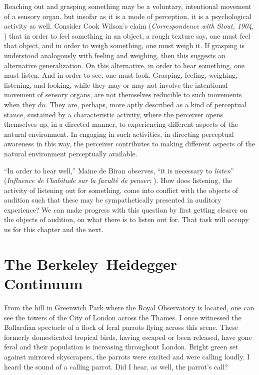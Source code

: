 Reaching out and grasping something may be a voluntary, intentional movement of a sensory organ, but insofar as it is a mode of perception, it is a psychological activity as well. Consider Cook Wilson's claim (\emph{Correspondence with Stout, 1904}, \citeyear{Cook-Wilson:1926sf}) that in order to feel something in an object, a rough texture say, one must feel that object, and in order to weigh something, one must weigh it. If grasping is understood analogously with feeling and weighing, then this suggests an alternative generalization. On this alternative, in order to hear something, one must listen. And in order to see, one must look. Grasping, feeling, weighing, listening, and looking, while they may or may not involve the intentional movement of sensory organs, are not themselves reducible to such movements when they do. They are, perhaps, more aptly described as a kind of perceptual stance, sustained by a characteristic activity, where the perceiver opens themselves up, in a directed manner, to experiencing different aspects of the natural environment. In engaging in such activities, in directing perceptual awareness in this way, the perceiver contributes to making different aspects of the natural environment perceptually available.

``In order to hear well,'' Maine de Biran observes, ``it is necessary to \emph{listen}'' (\emph{Influence de l'habitude sur la faculté de penser}; \citealt[63--4]{Boehm:1929aa}). How does listening, the activity of listening out for something, come into conflict with the objects of audition such that these may be sympathetically presented in auditory experience? We can make progress with this question by first getting clearer on the objects of audition, on what there is to listen out for. That task will occupy us for this chapter and the next.


\section{The Berkeley--Heidegger Continuum} %
\label{sec:the_berkeley_heidegger_continuum}

From the hill in Greenwich Park where the Royal Observatory is located, one can see the towers of the City of London across the Thames. I once witnessed the Ballardian spectacle of a flock of feral parrots flying across this scene. These formerly domesticated tropical birds, having escaped or been released, have gone feral and their population is increasing throughout London. Bright green set against mirrored skyscrapers, the parrots were excited and were calling loudly. I heard the sound of a calling parrot. Did I hear, as well, the parrot's call?

